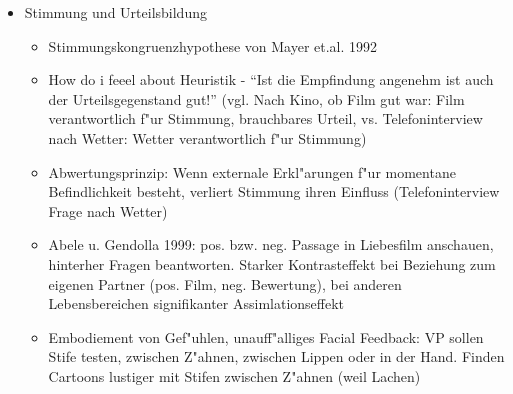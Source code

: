 \begin{itemize}
\begin{itemize}
\begin{itemize}
				\end{itemize}
			\item
				Stimmung und Urteilsbildung
				\begin{itemize}
					\item
						Stimmungskongruenzhypothese von Mayer et.al. 1992
					\item
						How do i feeel about Heuristik - \enquote{Ist die Empfindung angenehm ist auch der Urteilsgegenstand gut!} (vgl. Nach Kino, ob Film gut war: Film verantwortlich f"ur Stimmung, brauchbares Urteil, vs. Telefoninterview nach Wetter: Wetter verantwortlich f"ur Stimmung)
					\item
						Abwertungsprinzip: Wenn externale Erkl"arungen f"ur momentane Befindlichkeit besteht, verliert Stimmung ihren Einfluss (Telefoninterview Frage nach Wetter)
					\item
						Abele u. Gendolla 1999: pos. bzw. neg. Passage in Liebesfilm anschauen, hinterher Fragen beantworten. Starker Kontrasteffekt bei Beziehung zum eigenen Partner (pos. Film, neg. Bewertung), bei anderen Lebensbereichen signifikanter Assimlationseffekt 
					\item
						Embodiement von Gef"uhlen, unauff"alliges Facial Feedback: VP sollen Stife testen, zwischen Z"ahnen, zwischen Lippen oder in der Hand. Finden Cartoons lustiger mit Stifen zwischen Z"ahnen (weil Lachen)
				\end{itemize}
		\end{itemize}
\end{itemize}
